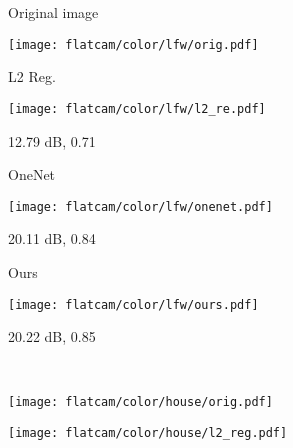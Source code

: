 \documentclass[journal,twoside]{IEEEtran}
\begin{document}
\begin{figure*}[!t]
    \centering
\begin{minipage}{\textwidth}
\centering
\begin{minipage}{.18\textwidth}
\centerline{Original image}
\vspace{0.01cm}
\texttt{[image: flatcam/color/lfw/orig.pdf]}  
\centerline{}
\end{minipage}\hspace{0.1cm}
\begin{minipage}{.18\textwidth}
\centerline{L2 Reg.}
\vspace{0.1cm}
\texttt{[image: flatcam/color/lfw/l2\_re.pdf]}  
  
\centerline{ 12.79 dB, 0.71}
\end{minipage}\hspace{0.1cm}
\begin{minipage}{.18\textwidth}
\centerline{OneNet}
\vspace{0.1cm}
\texttt{[image: flatcam/color/lfw/onenet.pdf]}  
  
\centerline{ 20.11 dB, 0.84}
\end{minipage}\hspace{0.1cm}
\begin{minipage}{.18\textwidth}
\centerline{Ours}
\vspace{0.1cm}
\texttt{[image: flatcam/color/lfw/ours.pdf]}  
\centerline{ 20.22 dB, 0.85}

\end{minipage}\\

\end{minipage}

\begin{minipage}{\textwidth}
\centering
\begin{minipage}{.18\textwidth}

\vspace{0.01cm}
\texttt{[image: flatcam/color/house/orig.pdf]}  
\centerline{}
\end{minipage}\hspace{0.1cm}
\begin{minipage}{.18\textwidth}
\vspace{0.1cm}
\texttt{[image: flatcam/color/house/l2\_reg.pdf]}  
  

\end{minipage}
\end{minipage}
\end{figure*}
\end{document}
